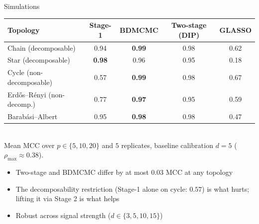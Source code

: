 \begin{frame}[t]{Simulations}
    \footnotesize
    \begin{table}[H]
        \centering
        \begin{tabular}{lcccc}
            \toprule
            Topology & Stage-1 & BDMCMC & Two-stage (DIP) & GLASSO \\
            \midrule
            Chain (decomposable)               & 0.94 & \textbf{0.99} & 0.98 & 0.62 \\
            Star (decomposable)                & \textbf{0.98} & 0.96 & 0.95 & 0.18 \\
            Cycle (non-decomposable)           & 0.57 & \textbf{0.99} & 0.98 & 0.67 \\
            Erd\H{o}s--R\'enyi (non-decomp.)   & 0.77 & \textbf{0.97} & 0.95 & 0.59 \\
            Barab\'asi--Albert                 & 0.95 & \textbf{0.98} & 0.98 & 0.47 \\
            \bottomrule
        \end{tabular}
        \\[0.3em]
        \scriptsize
        Mean MCC over $p \in \{5, 10, 20\}$ and $5$ replicates, baseline calibration $d=5$ ($\rho_{\max} \approx 0.38$).
    \end{table}
    \vspace{0.2cm}

    \begin{itemize}
        \item Two-stage and BDMCMC differ by at most $0.03$ MCC at any topology
        \item The decomposability restriction (Stage-1 alone on cycle: $0.57$) is what hurts; lifting it via Stage 2 is what helps
        \item Robust across signal strength ($d \in \{3, 5, 10, 15\}$)
    \end{itemize}
\end{frame}

